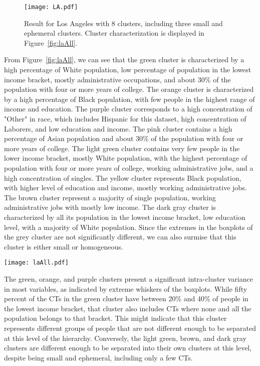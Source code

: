 \begin{figure}
    \centering 
    \texttt{[image: LA.pdf]}
    \caption{Result for Los Angeles with 8 clusters, including three small and
        ephemeral clusters. Cluster characterization is displayed
        in Figure~\ref{fig:laAll}.\label{fig:la}}
\end{figure}

From Figure~\ref{fig:laAll}, we can see that the green cluster is characterized
by a high percentage of White population, low percentage of population in the
lowest income bracket, mostly administrative occupations, and about 30\% of the
population with four or more years of college. The orange cluster is
characterized by a high percentage of Black population, with few people in the
highest range of income and education. The purple cluster corresponds to a high
concentration of "Other" in race, which includes Hispanic for this dataset, high
concentration of Laborers, and low education and income. The pink cluster
contains a high percentage of Asian population and about 30\% of the population
with four or more years of college. The light green cluster contains very few
people in the lower income bracket, mostly White population, with the highest
percentage of population with four or more years of college, working
administrative jobs, and a high concentration of singles. The yellow cluster
represents Black population, with higher level of education and income, mostly
working administrative jobs. The brown cluster represent a majority of single
population, working administrative jobs with mostly low income. The dark gray
cluster is characterized by all its population in the lowest income bracket, low
education level, with a majority of White population. Since the extremes in the
boxplots of the grey cluster are not significantly different, we can also
surmise that this cluster is either small or homogeneous.

\begin{figure*}
    \centering 
    \texttt{[image: laAll.pdf]}
    \caption{Full characterization of the eight clusters found for LA. The red
     rectangles indicate the most relevant aspects for each
     cluster.\label{fig:laAll}}
\end{figure*}

The  green, orange, and purple clusters present a significant intra-cluster
variance in most variables, as indicated by extreme whiskers of the boxplots.
While fifty percent of the CTs in the green cluster have between 20\% and 40\%
of people in the lowest income bracket, that cluster also includes CTs where
none and all the population belongs to that bracket. This might indicate that
this cluster represents different groups of people that are not different enough
to be separated at this level of the hierarchy. Conversely, the light green,
brown, and dark gray clusters are different enough to be separated into their
own clusters at this level, despite being small and ephemeral, including only a
few CTs. 

